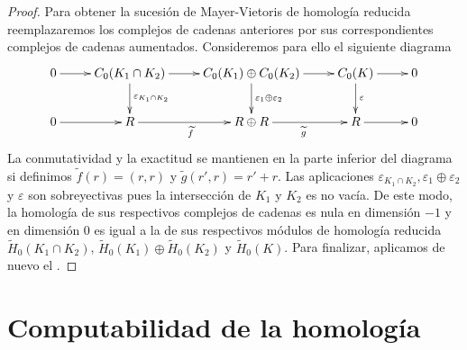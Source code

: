 \begin{proof}
	Para obtener la sucesión de Mayer-Vietoris de homología reducida reemplazaremos los complejos de cadenas anteriores por sus correspondientes complejos de cadenas aumentados. Consideremos para ello el siguiente diagrama
	\[
	\xymatrix{
		0 \ar@{->}[r] & C_0(K_1 \cap K_2) \ar@{->}[d]^{\varepsilon_{K_1 \cap K_2}} \ar@{->}[r] & C_0(K_1) \oplus C_0(K_2) \ar@{->}[r] \ar@{->}[d]^{\varepsilon_1 \oplus \varepsilon_2} & C_0(K) \ar@{->}[d]^{\varepsilon} \ar@{->}[r] & 0 \\
		0 \ar@{->}[r] & R \ar@{->}[r]_{\widetilde{f}} & R \oplus R \ar@{->}[r]_{\widetilde{g}} & R \ar@{->}[r] & 0
	}
	\]
	La conmutatividad y la exactitud se mantienen en la parte inferior del diagrama si definimos $\widetilde{f}(r) = (r,r)$ y $\widetilde{g}(r',r) = r'+r$. Las aplicaciones $\varepsilon_{K_1 \cap K_2}, \varepsilon_1 \oplus \varepsilon_2$ y $\varepsilon$ son sobreyectivas pues la intersección de $K_1$ y $K_2$ es no vacía. De este modo, la homología de sus respectivos complejos de cadenas es nula en dimensión $-1$ y en dimensión $0$ es igual a la de sus respectivos módulos de homología reducida $\widetilde{H}_0(K_1 \cap K_2)$, $\widetilde{H}_0(K_1) \oplus \widetilde{H}_0(K_2)$ y $\widetilde{H}_0(K)$. Para finalizar, aplicamos de nuevo el .
\end{proof}



\section{Computabilidad de la homología}

\endinput
